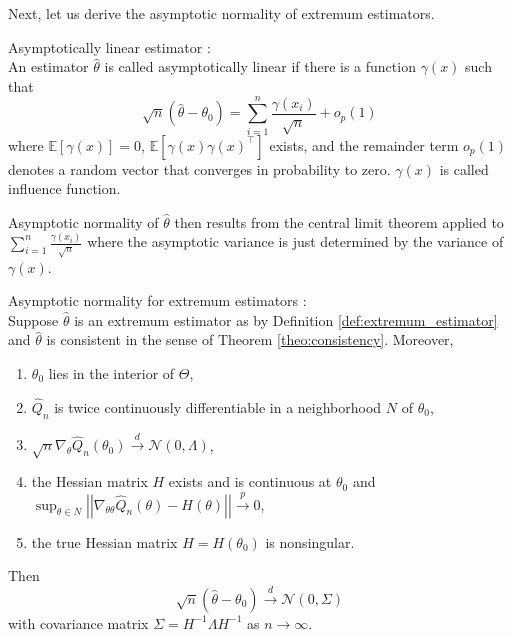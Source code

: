 Next, let us derive the asymptotic normality of extremum estimators.

\begin{definition}
	Asymptotically linear estimator \cite[Equation 3.3]{NM94}: \\
	An estimator $\hat{\theta}$ is called asymptotically linear if there is a function $\gamma(x)$ such that
	\[
	\sqrt{n} \left( \hat{\theta} - \theta_0 \right) = \sum_{i=1}^n \frac{\gamma(x_i)}{\sqrt{n}} + o_p(1)
	\]
	where $\mathbb{E} \left[ \gamma(x) \right]=0$, $\mathbb{E} \left[ \gamma(x) \gamma(x)^{\top} \right]$ exists, and the remainder term $o_p(1)$ denotes a random vector that converges in probability to zero. 
	$\gamma(x)$ is called influence function.
\end{definition}

Asymptotic normality of $\hat{\theta}$ then results from the central limit theorem applied to $\sum_{i=1}^n \frac{\gamma(x_i)}{\sqrt{n}}$ where the asymptotic variance is just determined by the variance of $\gamma(x)$.

\begin{theorem}
	\label{theo:asymptotic_normality_extremum}
	Asymptotic normality for extremum estimators \cite[Theorem 3.1]{NM94}: \\
	Suppose $\hat{\theta}$ is an extremum estimator as by Definition \ref{def:extremum_estimator} and $\hat{\theta}$ is consistent in the sense of Theorem \ref{theo:consistency}.
	Moreover,
	\begin{enumerate}
		\item $\theta_0$ lies in the interior of $\Theta$,
		\item $\hat{Q}_n$ is twice continuously differentiable in a neighborhood $N$ of $\theta_0$,
		\item $\sqrt{n} \nabla_{\theta} \hat{Q}_n(\theta_0) \xrightarrow{d} \mathcal{N} (0,\Lambda)$,
		\item the Hessian matrix $H$ exists and is continuous at $\theta_0$ and \\ 
		$\sup_{\theta \in N} \left| \left| \nabla_{\theta \theta} \hat{Q}_n(\theta) - H(\theta) \right| \right| \xrightarrow{p} 0$, 
		\item the true Hessian matrix $H=H(\theta_0)$ is nonsingular.
	\end{enumerate}
	Then
	\[
	\sqrt{n} \left( \hat{\theta} - \theta_0 \right) \xrightarrow{d} \mathcal{N} \left( 0, \Sigma \right)
	\]
	with covariance matrix $\Sigma = H^{-1} \Lambda H^{-1}$ as $n \rightarrow \infty$.
\end{theorem}

